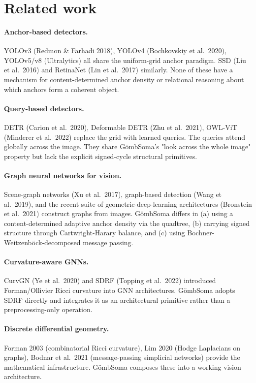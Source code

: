 \documentclass[11pt,a4paper]{article}
\newcommand{\GS}{G\"ombSoma}
\begin{document}
\section{Related work}

\paragraph{Anchor-based detectors.} YOLOv3 (Redmon \& Farhadi 2018),
YOLOv4 (Bochkovskiy et al.\ 2020), YOLOv5/v8 (Ultralytics) all
share the uniform-grid anchor paradigm. SSD (Liu et al.\ 2016) and
RetinaNet (Lin et al.\ 2017) similarly. None of these have a
mechanism for content-determined anchor density or relational
reasoning about which anchors form a coherent object.

\paragraph{Query-based detectors.} DETR (Carion et al.\ 2020),
Deformable DETR (Zhu et al.\ 2021), OWL-ViT (Minderer et al.\ 2022)
replace the grid with learned queries. The queries attend globally
across the image. They share \GS's "look across the whole image"
property but lack the explicit signed-cycle structural primitives.

\paragraph{Graph neural networks for vision.} Scene-graph
networks (Xu et al.\ 2017), graph-based detection (Wang et al.\
2019), and the recent suite of geometric-deep-learning architectures
(Bronstein et al.\ 2021) construct graphs from images. \GS{} differs
in (a) using a content-determined adaptive anchor density via the
quadtree, (b) carrying signed structure through Cartwright-Harary
balance, and (c) using Bochner-Weitzenböck-decomposed message passing.

\paragraph{Curvature-aware GNNs.} CurvGN (Ye et al.\ 2020) and
SDRF (Topping et al.\ 2022) introduced Forman/Ollivier Ricci
curvature into GNN architectures. \GS{} adopts SDRF directly and
integrates it as an architectural primitive rather than a
preprocessing-only operation.

\paragraph{Discrete differential geometry.} Forman 2003
(combinatorial Ricci curvature), Lim 2020 (Hodge Laplacians on
graphs), Bodnar et al.\ 2021 (message-passing simplicial networks)
provide the mathematical infrastructure. \GS{} composes these
into a working vision architecture.
\end{document}
